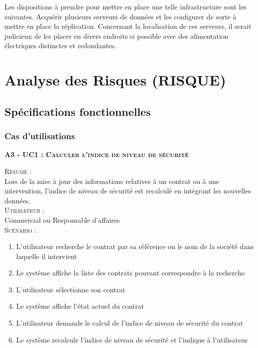 Les dispositions à prendre pour mettre en place une telle infrastructure sont les suivantes. Acquérir plusieurs serveurs de données et les configurer de sorte à mettre en place la réplication. Concernant la localisation de ces serveurs, il serait judicieux de les placer en divers endroits si possible avec des alimentation électriques distinctes et redondantes. 

\section{Analyse des Risques (RISQUE)}%

\subsection{Spécifications fonctionnelles}

\subsubsection{Cas d’utilisations}

\noindent\textsc{\bf{A3 - UC1 :} Calculer l’indice de niveau de sécurité}
\begin{shaded}
\noindent\textsc{Résumé :}\\

Lors de la mise à jour des informations relatives à un contrat ou à une intervention, l’indice de niveau de sécurité est recalculé en intégrant les nouvelles données. \\

\noindent\textsc{Utilisateur :} \\

Commercial ou Responsable d’affaires \\

\noindent\textsc{Scénario :} \\
\begin{enumerate}
    \item L’utilisateur recherche le contrat par sa référence ou le nom de la société dans laquelle il intervient
    \item Le système affiche la liste des contrats pouvant correspondre à la recherche
    \item L’utilisateur sélectionne son contrat
    \item Le système affiche l’état actuel du contrat
    \item L’utilisateur demande le calcul de l’indice de niveau de sécurité du contrat
    \item Le système recalcule l’indice de niveau de sécurité et l’indique à l’utilisateur
\end{enumerate}
\end{shaded}

